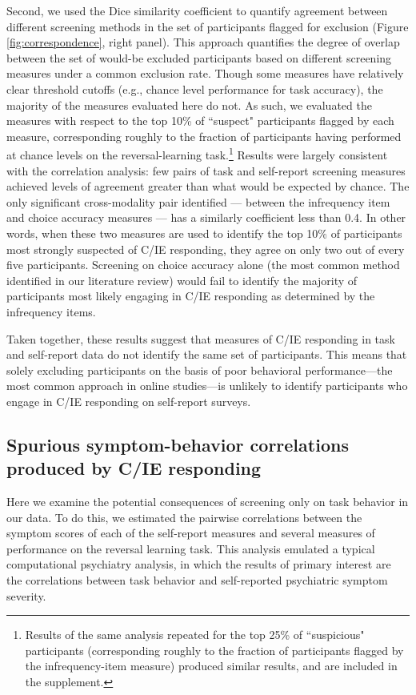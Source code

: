 \documentclass[a4paper,notitlepage,12pt]{article}
\begin{document}
\begin{refsection}[main]
Second, we used the Dice similarity coefficient to quantify agreement between different screening methods in the set of participants flagged for exclusion (Figure \ref{fig:correspondence}, right panel). This approach quantifies the degree of overlap between the set of would-be excluded participants based on different screening measures under a common exclusion rate. Though some measures have relatively clear threshold cutoffs (e.g., chance level performance for task accuracy), the majority of the measures evaluated here do not. As such, we evaluated the measures with respect to the top 10\% of ``suspect" participants flagged by each measure, corresponding roughly to the fraction of participants having performed at chance levels on the reversal-learning task.\footnote{Results of the same analysis repeated for the top 25\% of ``suspicious" participants (corresponding roughly to the fraction of participants flagged by the infrequency-item measure) produced similar results, and are included in the supplement.} Results were largely consistent with the correlation analysis: few pairs of task and self-report screening measures achieved levels of agreement greater than what would be expected by chance. The only significant cross-modality pair identified --- between the infrequency item and choice accuracy measures --- has a similarly coefficient less than 0.4. In other words, when these two measures are used to identify the top 10\% of participants most strongly suspected of C/IE responding, they agree on only two out of every five participants. Screening on choice accuracy alone (the most common method identified in our literature review) would fail to identify the majority of participants most likely engaging in C/IE responding as determined by the infrequency items.

Taken together, these results suggest that measures of C/IE responding in task and self-report data do not identify the same set of participants. This means that solely excluding participants on the basis of poor behavioral performance---the most common approach in online studies---is unlikely to identify participants who engage in C/IE responding on self-report surveys. 

\subsection{Spurious symptom-behavior correlations produced by C/IE responding}

Here we examine the potential consequences of screening only on task behavior in our data. To do this, we estimated the pairwise correlations between the symptom scores of each of the self-report measures and several measures of performance on the reversal learning task. This analysis emulated a typical computational psychiatry analysis, in which the results of primary interest are the correlations between task behavior and self-reported psychiatric symptom severity.


\end{refsection}
\end{document}
